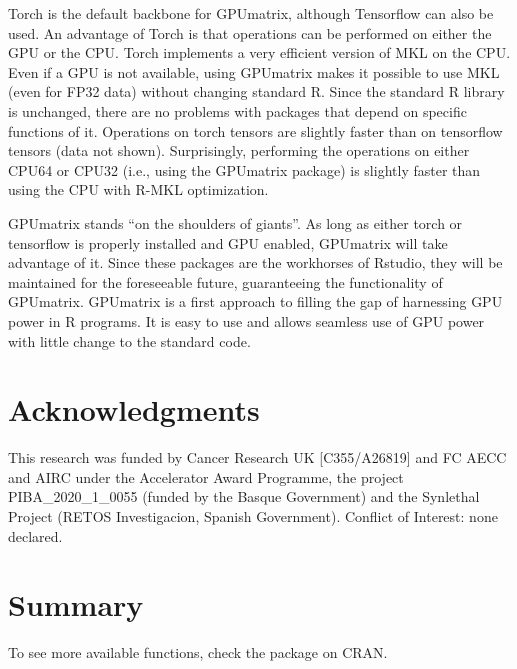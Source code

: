Torch is the default backbone for GPUmatrix, although Tensorflow can also be used. An advantage of Torch is that operations can be performed on either the GPU or the CPU. Torch implements a very efficient version of MKL on the CPU. Even if a GPU is not available, using GPUmatrix makes it possible to use MKL (even for FP32 data) without changing standard R. Since the standard R library is unchanged, there are no problems with packages that depend on specific functions of it. Operations on torch tensors are slightly faster than on tensorflow tensors (data not shown). Surprisingly, performing the operations on either CPU64 or CPU32 (i.e., using the GPUmatrix package) is slightly faster than using the CPU with R-MKL optimization.

GPUmatrix stands ``on the shoulders of giants''. As long as either torch or tensorflow is properly installed and GPU enabled, GPUmatrix will take advantage of it. Since these packages are the workhorses of Rstudio, they will be maintained for the foreseeable future, guaranteeing the functionality of GPUmatrix. GPUmatrix is a first approach to filling the gap of harnessing GPU power in R programs. It is easy to use and allows seamless use of GPU power with little change to the standard code.

\hypertarget{acknowledgments}{%
\section{Acknowledgments}\label{acknowledgments}}

This research was funded by Cancer Research UK {[}C355/A26819{]} and FC AECC and AIRC under the Accelerator Award Programme, the project PIBA\_2020\_1\_0055 (funded by the Basque Government) and the Synlethal Project (RETOS Investigacion, Spanish Government). Conflict of Interest: none declared.

\hypertarget{summary}{%
\section{Summary}\label{summary}}

To see more available functions, check the  package on CRAN.



\address{%
César Lobato-Fernández\\
University of Navarra\\%
Department of Biomedical Engineering and Sciences\\ Paseo Mikeletegui,48, 20009, San Sebastian, Gipuzkoa, Spain\\
%
%
\textit{ORCiD: \href{https://orcid.org/0000-0001-9576-7236}{0000-0001-9576-7236}}\\%
\href{mailto:clobatofern@unav.es}{\nolinkurl{clobatofern@unav.es}}%
}

